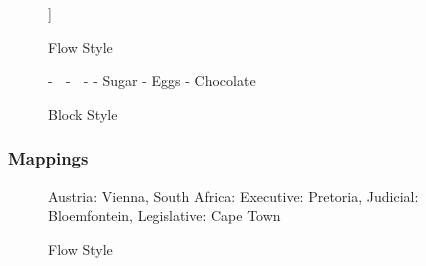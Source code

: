 \begin{figure}[H]
  \begin{minipage}[t]{0.48\textwidth}
    \vspace{0pt}
    \begin{bchart}[max=9, width=0.85\textwidth]
    \end{bchart}
  \end{minipage}
  \begin{minipage}[t]{0.48\textwidth}
    \vspace{0pt}
    \begin{yamlcode}
      [🍎, 🍊,
        [Sugar, Eggs, Chocolate]
      ]
    \end{yamlcode}
  \end{minipage}
  \caption{Flow Style}
\end{figure}

\begin{figure}[H]
  \begin{minipage}[t]{0.48\textwidth}
    \vspace{0pt}
    \begin{bchart}[max=9, width=0.85\textwidth]
    \end{bchart}
  \end{minipage}
  \begin{minipage}[t]{0.48\textwidth}
    \vspace{0pt}
    \begin{yamlcode}
      - 🍎
      - 🍊
      - - Sugar
        - Eggs
        - Chocolate
    \end{yamlcode}
  \end{minipage}
  \caption{Block Style}
\end{figure}

\subsubsection{Mappings}

\begin{figure}[H]
  \begin{minipage}[t]{0.48\textwidth}
    \vspace{0pt}
    \begin{bchart}[max=9, width=0.85\textwidth]
    \end{bchart}
  \end{minipage}
  \begin{minipage}[t]{0.48\textwidth}
    \vspace{0pt}
    \begin{yamlcode}
      { Austria: Vienna,
        South Africa: {
          Executive: Pretoria,
          Judicial: Bloemfontein,
          Legislative: Cape Town}
      }
    \end{yamlcode}
  \end{minipage}
  \caption{Flow Style}
\end{figure}

